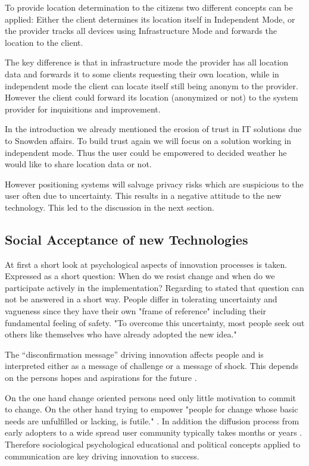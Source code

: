 To provide location determination to the citizens two different concepts can be applied: Either the client determines its location itself in Independent Mode, or the provider tracks all devices using Infrastructure Mode and forwards the location to the client. 

The key difference is that in infrastructure mode the provider has all location data and forwards it to some clients requesting their own location, while in independent mode the client can locate itself still being anonym to the provider. However the client could forward its location (anonymized or not) to the system provider for inquisitions and improvement.

In the introduction we already mentioned the erosion of trust in IT solutions due to Snowden affairs. To build trust again we will focus on a solution working in independent mode. Thus the user could be empowered to decided weather he would like to share location data or not.

However positioning systems will salvage privacy risks which are suspicious to the user often due to uncertainty. This results in a negative attitude to the new technology. This led to the discussion in the next section.  

\subsection{Social Acceptance of new Technologies}
At first a short look at psychological aspects of innovation processes is taken. Expressed as a short question: When do we resist change and when do we participate actively in the implementation? Regarding to \textcite{MSMueller} stated that question can not be answered in a short way. People differ in tolerating uncertainty and vagueness since they have their own "frame of reference" including their fundamental feeling of safety. "To overcome this uncertainty, most people seek out others like themselves who have already adopted the new idea." \parencite{rogers2003diffusion}

The “disconfirmation message”  driving innovation affects people and is interpreted either as a message of challenge or a message of shock. This depends on the persons hopes and aspirations for the future \parencite{MSMueller}.

On the one hand change oriented persons need only little motivation to commit to change. On the other hand trying to empower "people for change whose basic needs are unfulfilled or lacking, is futile." \parencite{MSMueller}. In addition the diffusion process from early adopters to a wide spread user community typically takes months or years \parencite{rogers2003diffusion}. Therefore sociological psychological educational and political concepts applied to communication are key driving innovation to success.

